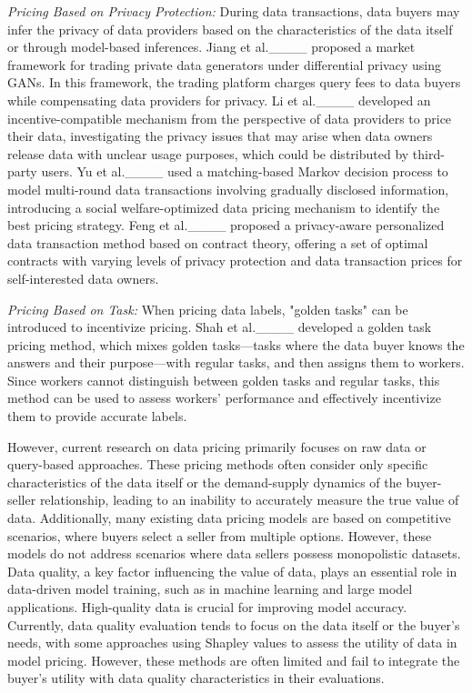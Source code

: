 \textit{Pricing Based on Privacy Protection:} 
During data transactions, data buyers may infer the privacy of data providers based on the characteristics of the data itself or through model-based inferences. Jiang et al.____ proposed a market framework for trading private data generators under differential privacy using GANs. In this framework, the trading platform charges query fees to data buyers while compensating data providers for privacy. Li et al.____ developed an incentive-compatible mechanism from the perspective of data providers to price their data, investigating the privacy issues that may arise when data owners release data with unclear usage purposes, which could be distributed by third-party users. Yu et al.____ used a matching-based Markov decision process to model multi-round data transactions involving gradually disclosed information, introducing a social welfare-optimized data pricing mechanism to identify the best pricing strategy. Feng et al.____ proposed a privacy-aware personalized data transaction method based on contract theory, offering a set of optimal contracts with varying levels of privacy protection and data transaction prices for self-interested data owners.

\textit{Pricing Based on Task:} 
When pricing data labels, "golden tasks" can be introduced to incentivize pricing. Shah et al.____ developed a golden task pricing method, which mixes golden tasks—tasks where the data buyer knows the answers and their purpose—with regular tasks, and then assigns them to workers. Since workers cannot distinguish between golden tasks and regular tasks, this method can be used to assess workers' performance and effectively incentivize them to provide accurate labels.

However, current research on data pricing primarily focuses on raw data or query-based approaches. These pricing methods often consider only specific characteristics of the data itself or the demand-supply dynamics of the buyer-seller relationship, leading to an inability to accurately measure the true value of data. Additionally, many existing data pricing models are based on competitive scenarios, where buyers select a seller from multiple options. However, these models do not address scenarios where data sellers possess monopolistic datasets. Data quality, a key factor influencing the value of data, plays an essential role in data-driven model training, such as in machine learning and large model applications. High-quality data is crucial for improving model accuracy. Currently, data quality evaluation tends to focus on the data itself or the buyer's needs, with some approaches using Shapley values to assess the utility of data in model pricing. However, these methods are often limited and fail to integrate the buyer's utility with data quality characteristics in their evaluations.